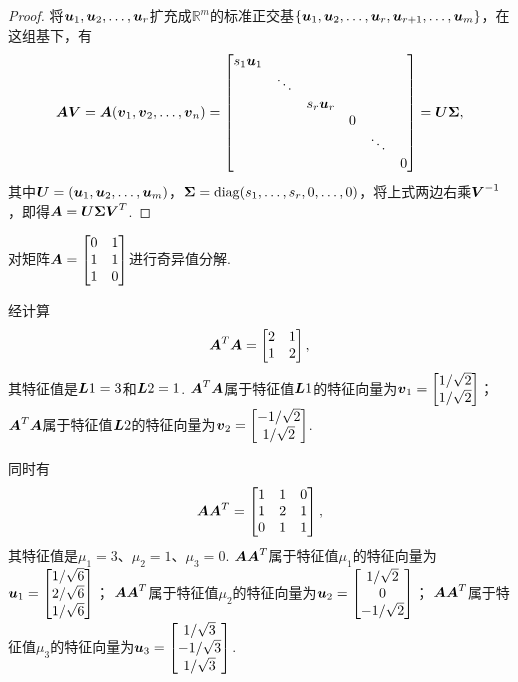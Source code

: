 \begin{theorem}
\begin{proof}
将\(\boldsymbol{u}_1,\boldsymbol{u}_2,\dotsc,\boldsymbol{u}_r\)扩充成\(\mathbb{R}^m\)的标准正交基\(\{\boldsymbol{u}_1,\boldsymbol{u}_2,\dotsc,\boldsymbol{u}_r,\boldsymbol{u}_{r+1},\dotsc,\boldsymbol{u}_m\}\)，在这组基下，有\[
\A\Q = \A(\q_1,\q_2,\dotsc,\q_n) = \begin{bmatrix}
s_1 \p_1 \\
& \ddots \\
& & s_r \p_r \\
& & & 0 \\
& & & & \ddots \\
& & & & & 0
\end{bmatrix}
= \P \S,
\]其中\(\P = (\p_1,\p_2,\dotsc,\p_m)\)，\(\S = \diag(s_1,\dotsc,s_r,0,\dotsc,0)\)，将上式两边右乘\(\Q^{-1}\)，即得\(\A = \P\S\Q^T\).
\end{proof}
\end{theorem}

\begin{example}
\def\U{\mat{U}}
\def\S{\mat{\Sigma}}
\def\V{\mat{V}}
\def\M#1{\mu_{#1}}
对矩阵\(\boldsymbol{A} = \begin{bmatrix} 0 & 1 \\ 1 & 1 \\ 1 & 0 \end{bmatrix}\)进行奇异值分解.
\begin{solution}
经计算\[
\boldsymbol{A}^T \boldsymbol{A} = \begin{bmatrix} 2 & 1 \\ 1 & 2 \end{bmatrix},
\]其特征值是\(\boldsymbol{L}{1} = 3\)和\(\boldsymbol{L}{2} = 1\).
\(\boldsymbol{A}^T \boldsymbol{A}\)属于特征值\(\boldsymbol{L}{1}\)的特征向量为\(\boldsymbol{v}_1 = \begin{bmatrix} 1/\sqrt{2} \\ 1/\sqrt{2} \end{bmatrix}\)；
\(\boldsymbol{A}^T \boldsymbol{A}\)属于特征值\(\boldsymbol{L}{2}\)的特征向量为\(\boldsymbol{v}_2 = \begin{bmatrix} -1/\sqrt{2} \\ 1/\sqrt{2} \end{bmatrix}\).

同时有\[
\boldsymbol{A} \boldsymbol{A}^T = \begin{bmatrix} 1 & 1 & 0 \\ 1 & 2 & 1 \\ 0 & 1 & 1 \end{bmatrix},
\]其特征值是\(\M{1} = 3\)、\(\M{2} = 1\)、\(\M{3} = 0\).
\(\boldsymbol{A} \boldsymbol{A}^T\)属于特征值\(\M{1}\)的特征向量为\(\boldsymbol{u}_1 = \begin{bmatrix} 1/\sqrt{6} \\ 2/\sqrt{6} \\ 1/\sqrt{6} \end{bmatrix}\)；
\(\boldsymbol{A} \boldsymbol{A}^T\)属于特征值\(\M{2}\)的特征向量为\(\boldsymbol{u}_2 = \begin{bmatrix} 1/\sqrt{2} \\ 0 \\ -1/\sqrt{2} \end{bmatrix}\)；
\(\boldsymbol{A} \boldsymbol{A}^T\)属于特征值\(\M{3}\)的特征向量为\(\boldsymbol{u}_3 = \begin{bmatrix} 1/\sqrt{3} \\ -1/\sqrt{3} \\ 1/\sqrt{3} \end{bmatrix}\).


\end{solution}
\end{example}
